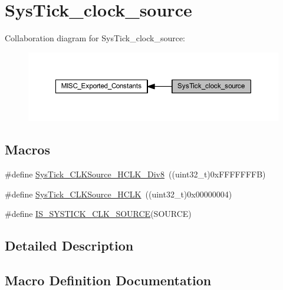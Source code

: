 \hypertarget{group___sys_tick__clock__source}{}\section{Sys\+Tick\+\_\+clock\+\_\+source}
\label{group___sys_tick__clock__source}
Collaboration diagram for Sys\+Tick\+\_\+clock\+\_\+source\+:
\nopagebreak
\begin{figure}[H]
\begin{center}
\leavevmode
\includegraphics[width=350pt]{group___sys_tick__clock__source}
\end{center}
\end{figure}
\subsection*{Macros}
\begin{DoxyCompactItemize}
\item 
\#define \hyperlink{group___sys_tick__clock__source_ga545c387ce43db90f15faad5f354f890d}{Sys\+Tick\+\_\+\+C\+L\+K\+Source\+\_\+\+H\+C\+L\+K\+\_\+\+Div8}~((uint32\+\_\+t)0x\+F\+F\+F\+F\+F\+F\+F\+B)
\item 
\#define \hyperlink{group___sys_tick__clock__source_ga8a885ce2632ad4c35e229bb7c6e60191}{Sys\+Tick\+\_\+\+C\+L\+K\+Source\+\_\+\+H\+C\+LK}~((uint32\+\_\+t)0x00000004)
\item 
\#define \hyperlink{group___sys_tick__clock__source_ga22d6291f6aed29442cf4cd9098fa0784}{I\+S\+\_\+\+S\+Y\+S\+T\+I\+C\+K\+\_\+\+C\+L\+K\+\_\+\+S\+O\+U\+R\+CE}(S\+O\+U\+R\+CE)
\end{DoxyCompactItemize}


\subsection{Detailed Description}


\subsection{Macro Definition Documentation}
\mbox{\label{group___sys_tick__clock__source_ga22d6291f6aed29442cf4cd9098fa0784}} 
